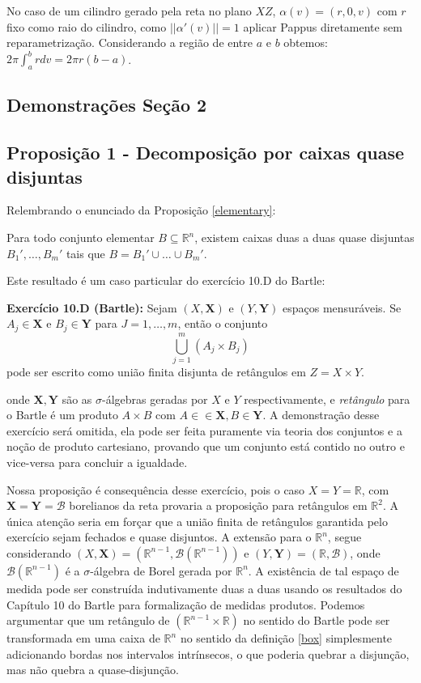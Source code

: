 \documentclass[12pt,letterpaper]{article}
\newcommand{\real}{\mathbb{R}}
\newcommand{\rr}{\mathbb{R}^2}
\newcommand{\rn}{\mathbb{R}^n}
\newcommand{\bd}[1]{\boldsymbol{#1}}
\begin{document}
No caso de um cilindro gerado pela reta no plano $XZ$, $\alpha(v)=(r,0,v)$ com $r$ fixo como raio do cilindro, como $||\alpha'(v)||=1$ aplicar Pappus diretamente sem reparametrização. Considerando a região de entre $a$ e $b$ obtemos: $2\pi\int_a^ b rdv=2\pi r(b-a)$.
	\begin{appendices}
		\section{Demonstrações Seção 2}
		\label{appA}
			\subsection{Proposição 1 - Decomposição por caixas quase disjuntas}
			Relembrando o enunciado da Proposição \ref{elementary}:
			
			Para todo conjunto elementar $B\subseteq\rn$, existem caixas duas a duas quase disjuntas $B_1',\ldots,B_m'$ tais que $B=B_1'\cup\ldots\cup B_m'$.
			
			Este resultado é um caso particular do exercício 10.D do Bartle\cite{bartle2014elements}:
			
			\textbf{Exercício 10.D (Bartle):} Sejam $(X,\bd X)$ e $(Y,\bd Y)$ espaços mensuráveis. Se $A_j\in\bd X$ e $B_j\in\bd Y$ para $J=1,\ldots,m$, então o conjunto 
			$$\bigcup_{j=1}^{m}(A_j\times B_j)$$
			pode ser escrito como união finita disjunta de retângulos em $Z=X\times Y$.
			
			onde $\bd X,\bd Y$ são as $\sigma$-álgebras geradas por $X$ e $Y$ respectivamente, e \textit{retângulo} para o Bartle é um produto $A\times B$ com $A\in\in\bd X,B\in\bd Y$. A demonstração desse exercício será omitida, ela pode ser feita puramente via teoria dos conjuntos e a noção de produto cartesiano, provando que um conjunto está contido no outro e vice-versa  para concluir a igualdade.
			
			Nossa proposição é consequência desse exercício, pois o caso $X=Y=\real$, com $\bd X=\bd Y=\mathcal{B}$ borelianos da reta provaria a proposição para retângulos em $\rr$. A única atenção seria em forçar que a união finita de retângulos garantida pelo exercício sejam fechados e quase disjuntos. A extensão para o $\rn$, segue considerando $(X,\bd X)=(\real^{n-1},\mathcal{B}(\real^{n-1}))$ e $(Y,\bd Y)=(\real,\mathcal{B})$, onde $\mathcal{B}(\real^{n-1})$ é a $\sigma$-álgebra de Borel gerada por $\rn$. A existência de tal espaço de medida pode ser construída indutivamente duas a duas usando os resultados do Capítulo 10 do Bartle\cite{bartle2014elements} para formalização de medidas produtos. Podemos argumentar que um retângulo de $(\real^{n-1}\times\real)$ no sentido do Bartle pode ser transformada em uma caixa de $\rn$ no sentido da definição \ref{box} simplesmente adicionando bordas nos intervalos intrínsecos, o que poderia quebrar a disjunção, mas não quebra a quase-disjunção.
			

\end{appendices}
\end{document}
